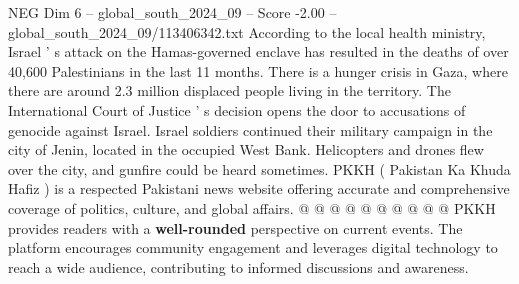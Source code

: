 \begin{textsample}{NEG Dim 6 – global\_south\_2024\_09 – Score -2.00 – global\_south\_2024\_09/113406342.txt}
According to the local health ministry, Israel ' s attack on the Hamas-governed enclave has resulted in the deaths of over 40,600 Palestinians in the last 11 months.
There is a hunger crisis in Gaza, where there are around 2.3 million displaced people living in the territory.
The International Court of Justice ' s decision opens the door to accusations of genocide against Israel.
Israel soldiers continued their military campaign in the city of Jenin, located in the occupied West Bank.
Helicopters and drones flew over the city, and gunfire could be heard sometimes.
PKKH ( Pakistan Ka Khuda Hafiz ) is a respected Pakistani news website offering accurate and comprehensive coverage of politics, culture, and global affairs. @ @ @ @ @ @ @ @ @ @ PKKH provides readers with a \textbf{well-rounded} perspective on current events.
The platform encourages community engagement and leverages digital technology to reach a wide audience, contributing to informed discussions and awareness.

\end{textsample}
